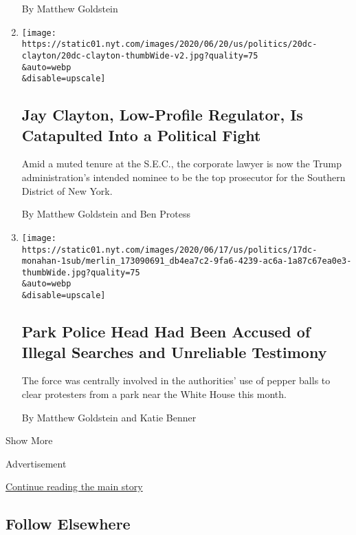 \begin{enumerate}
  By Matthew Goldstein
\item
  \href{/2020/06/20/business/jay-clayton-sdny-sec.html}{}

  \texttt{[image: https://static01.nyt.com/images/2020/06/20/us/politics/20dc-clayton/20dc-clayton-thumbWide-v2.jpg?quality=75\\\&auto=webp\\\&disable=upscale]}

  \hypertarget{jay-clayton-low-profile-regulator-is-catapulted-into-a-political-fight}{%
  \subsection{Jay Clayton, Low-Profile Regulator, Is Catapulted Into a
  Political
  Fight}\label{jay-clayton-low-profile-regulator-is-catapulted-into-a-political-fight}}

  Amid a muted tenure at the S.E.C., the corporate lawyer is now the
  Trump administration's intended nominee to be the top prosecutor for
  the Southern District of New York.

  By Matthew Goldstein and Ben Protess
\item
  \href{/2020/06/18/us/politics/park-police-gregory-monahan.html}{}

  \texttt{[image: https://static01.nyt.com/images/2020/06/17/us/politics/17dc-monahan-1sub/merlin\_173090691\_db4ea7c2-9fa6-4239-ac6a-1a87c67ea0e3-thumbWide.jpg?quality=75\\\&auto=webp\\\&disable=upscale]}

  \hypertarget{park-police-head-had-been-accused-of-illegal-searches-and-unreliable-testimony}{%
  \subsection{Park Police Head Had Been Accused of Illegal Searches and
  Unreliable
  Testimony}\label{park-police-head-had-been-accused-of-illegal-searches-and-unreliable-testimony}}

  The force was centrally involved in the authorities' use of pepper
  balls to clear protesters from a park near the White House this month.

  By Matthew Goldstein and Katie Benner
\end{enumerate}

Show More

Advertisement

\protect\hyperlink{after-mid2}{Continue reading the main story}

\hypertarget{follow-elsewhere}{%
\subsection{Follow Elsewhere}\label{follow-elsewhere}}


